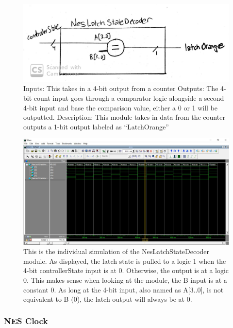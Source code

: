 \documentclass[a4paper]{article}
\begin{document}
\begin{figure}[H]
  \centering
    \includegraphics[width=.85\textwidth]{images/block_diagrams/nes/latch3.jpg}
	\caption{Inputs: This takes in a 4-bit output from a counter \newline
Outputs: The 4-bit count input goes through a comparator logic alongside a second 4-bit input and base the comparison value, either a 0 or 1 will be outputted. \newline
Description: This module takes in data from the counter outputs a 1-bit output labeled as “LatchOrange”}
    \label{fig:latch}
\end{figure}

\begin{figure}[H]
  \centering
    \includegraphics[width=.85\textwidth]{images/ModelSim/neslatch_sim.JPG}
	\caption{This is the individual simulation of the NesLatchStateDecoder module. As displayed, the latch state is pulled to a logic 1 when the 4-bit controllerState input is at 0. Otherwise, the output is at a logic 0. This makes sense when looking at the module, the B input is at a constant 0. As long at the 4-bit input, also named as A[3..0], is not equivalent to B (0), the latch output will always be at 0.}
    \label{fig:latch_sim}
\end{figure}

\subsubsection{NES Clock}
\end{document}
